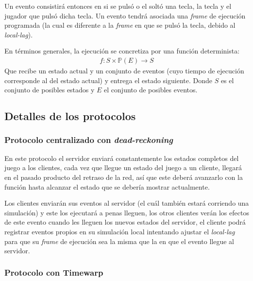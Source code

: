 Un evento consistirá entonces en si se pulsó o el soltó una tecla, la tecla y el jugador que pulsó dicha tecla. Un evento tendrá asociada una \emph{frame} de ejecución programada (la cual es diferente a la \emph{frame} en que se pulsó la tecla, debido al \emph{local-lag}).

En términos generales, la ejecución se concretiza por una función determinista:
\begin{align*}
    f : S \times \mathbb{P}(E) \rightarrow S
\end{align*}
Que recibe un estado actual y un conjunto de eventos (cuyo tiempo de ejecución corresponde al del estado actual) y entrega el estado siguiente. Donde $S$ es el conjunto de posibles estados y $E$ el conjunto de posibles eventos.

\subsection{Detalles de los protocolos}


\subsubsection{Protocolo centralizado con \emph{dead-reckoning}}

En este protocolo el servidor enviará constantemente los estados completos del juego a los clientes, cada vez que llegue un estado del juego a un cliente, llegará en el pasado producto del retraso de la red, así que este deberá avanzarlo con la función hasta alcanzar el estado que se debería mostrar actualmente.

Los clientes enviarán sus eventos al servidor (el cuál también estará corriendo una simulación) y este los ejecutará a penas lleguen, los otros clientes verán los efectos de este evento cuando les lleguen los nuevos estados del servidor, %
el cliente podrá registrar eventos propios en su simulación local intentando ajustar el \emph{local-lag} para que su \emph{frame} de ejecución sea la misma que la en que el evento llegue al servidor.

\subsubsection{Protocolo con Timewarp}



